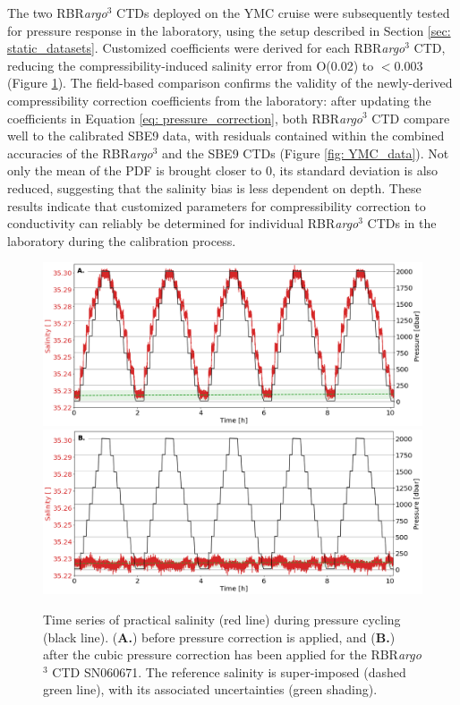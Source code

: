 \documentclass{ametsocV6.1}
\begin{document}
The two RBR\textit{argo}$^3$ CTDs deployed on the YMC cruise were subsequently tested for pressure response in the laboratory,  using the setup described in Section \ref{sec: static_datasets}.  
Customized coefficients were derived for each RBR\textit{argo}$^3$ CTD,  reducing the compressibility-induced salinity error from O(0.02)  to $<$0.003  (Figure \ref{fig: saltbladder_results}).  
The field-based comparison confirms the validity of the newly-derived compressibility correction coefficients from the laboratory: after updating the coefficients in Equation \ref{eq: pressure_correction},  both RBR\textit{argo}$^3$ CTD compare well to the calibrated SBE9 data,  with residuals contained within the combined accuracies of the RBR\textit{argo}$^3$ and the SBE9 CTDs (Figure \ref{fig: YMC_data}).  
Not only the mean of the PDF is brought closer to 0,  its standard deviation is also reduced,  suggesting that the salinity bias is less dependent on depth. These results indicate that customized parameters for compressibility correction to conductivity can reliably be determined for individual RBR\textit{argo}$^3$ CTDs in the laboratory during the calibration process.

\begin{figure}[t]
	\includegraphics[width = \linewidth]{Fig5_Pressure_correction_raw}\\
	\includegraphics[width = \linewidth]{Fig5_Pressure_correction_corr}\\
	\caption{Time series of practical salinity (red line) during pressure cycling (black line). (\textbf{A.}) before pressure correction is applied, and (\textbf{B.}) after the cubic pressure correction has been applied for the RBR\textit{argo}$^3$ CTD SN060671.  The reference salinity is super-imposed (dashed green line), with its associated uncertainties (green shading).}
	\label{fig: saltbladder_results}
\end{figure}
\end{document}
